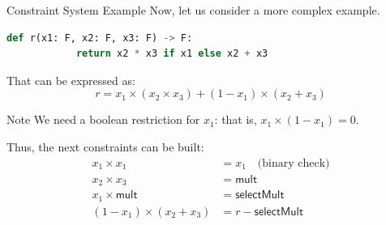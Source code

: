 \documentclass{zkdl-presentation-template}
\begin{document}
    \begin{frame}[fragile]{Constraint System Example}
        Now, let us consider a more complex example.
        \begin{lstlisting}[language=Python,numbers=none]
        def r(x1: F, x2: F, x3: F) -> F:
            return x2 * x3 if x1 else x2 + x3
        \end{lstlisting}

        \vspace{-10pt}

        That can be expressed as:
        \begin{equation*}
            r = x_1 \times (x_2 \times x_3) + (1 - x_1) \times (x_2 + x_3)
        \end{equation*}
        
        \pause
        \begin{alertblock}{Note}
            We need a boolean restriction for $x_1$: that is, $x_1 \times (1 - x_1) = 0$.
        \end{alertblock}

        \pause
        Thus, the next constraints can be built:
        \vspace{-5pt}
        \begin{align*}
            x_1 \times x_1 &= x_1 \quad \text{(binary check)} \tag{1} \\
            x_2 \times x_3 &= \mathsf{mult} \tag{2} \\
            x_1 \times \mathsf{mult} &= \mathsf{selectMult} \tag{3} \\
            (1 - x_1) \times (x_2 + x_3) &= r - \mathsf{selectMult} \tag{4}
        \end{align*}
    \end{frame}
\end{document}

